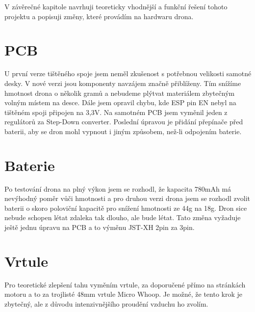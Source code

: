 V závěrečné kapitole navrhuji teoreticky vhodnější a funkční řešení tohoto projektu a popisuji změny, které provádím na hardwaru drona.

\section{PCB}
    U první verze tištěného spoje jsem neměl zkušenost s potřebnou velikosti samotné desky. V nové verzi jsou komponenty navzájem značně přiblíženy. Tím snížíme hmotnost drona o několik gramů a nebudeme plýtvat materiálem zbytečným volným místem na desce. Dále jsem opravil chybu, kde ESP pin EN nebyl na tištěném spoji připojen na 3,3V. Na samotném PCB jsem vyměnil jeden z regulátorů za Step-Down converter. Poslední úpravou je přidání přepínače před baterii, aby se dron mohl vypnout i jiným způsobem, než-li odpojením baterie.

\section{Baterie}
    Po testování drona na plný výkon jsem se rozhodl, že kapacita 780mAh má nevýhodný poměr vůči hmotnosti a pro druhou verzi drona jsem se rozhodl zvolit baterii o skoro poloviční kapacitě pro snížení hmotnosti ze 44g na 18g. Dron sice nebude schopen létat zdaleka tak dlouho, ale bude létat. Tato změna vyžaduje ještě jednu úpravu na PCB a to výměnu JST-XH 2pin za 3pin.

\section{Vrtule}
    Pro teoretické zlepšení tahu vyměním vrtule, za doporučené přímo na stránkách motoru\cite{motorv1} a to za trojlisté 48mm vrtule Micro Whoop. Je možné, že tento krok je zbytečný, ale z důvodu intenzivnějšího proudění vzduchu ho zvolím.